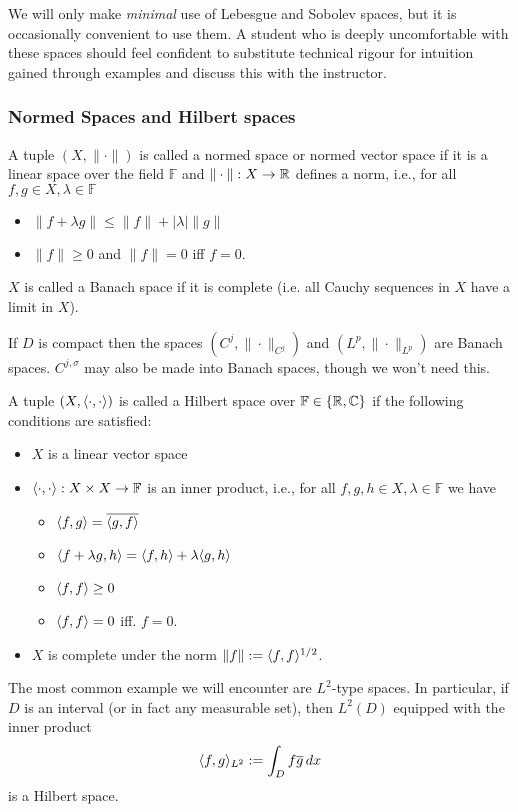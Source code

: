 We will only make {\em minimal} use of Lebesgue and Sobolev spaces, but it is occasionally convenient to use them. A student who is deeply uncomfortable with these spaces should feel confident to substitute technical rigour for intuition gained through examples and discuss this with the instructor.


\subsubsection{Normed Spaces and Hilbert spaces}
%
A tuple $(X, \|\cdot\|)$ is called a normed space or normed vector space if
it is a linear space over the field $\mathbb{F}$ and
$\|\cdot\| : X \to \mathbb{R}$ defines a norm, i.e., for all $f, g \in X, \lambda \in \mathbb{F}$
\begin{itemize}
  \item $\|f + \lambda g\| \leq \|f\| + |\lambda| \|g\|$
  \item $\|f\| \geq 0$ and $\|f\| = 0$ iff $f = 0$.
\end{itemize}
$X$ is called a Banach space if it is complete (i.e. all Cauchy sequences
in $X$ have a limit in $X$).

If $D$ is compact then the spaces $(C^j, \|\cdot\|_{C^j})$ and
$(L^p, \|\cdot\|_{L^p})$ are Banach spaces. $C^{j,\sigma}$ may also be made
into Banach spaces, though we won't need this.

A tuple $(X, \langle\cdot, \cdot\rangle)$ is called a Hilbert space over $\mathbb{F} \in
\{\mathbb{R}, \mathbb{C}\}$ if the following conditions are satisfied:
\begin{itemize}
  \item $X$ is a linear vector space
  \item $\langle\cdot, \cdot\rangle : X \times X \to \mathbb{F}$ is an inner product, i.e.,
  for all $f, g, h \in X, \lambda \in \mathbb{F}$ we have
  \begin{itemize}
      \item $\langle f, g\rangle = \overline{\langle g, f\rangle}$
      \item $\langle f + \lambda g, h \rangle = \langle f, h \rangle + \lambda \langle g, h \rangle$
      \item $\langle f, f \rangle \geq 0$
      \item $\langle f,f \rangle = 0$ iff. $f = 0$.
  \end{itemize}
  \item $X$ is complete under the norm $\|f\| := \langle f,f\rangle^{1/2}$.
\end{itemize}

The most common example we will encounter are $L^2$-type spaces. In particular,
if $D$ is an interval (or in fact any measurable set), then $L^2(D)$ equipped
with the inner product
\[
  \langle f, g \rangle_{L^2} := \int_D f \overline{g} \,dx
\]
is a Hilbert space.

